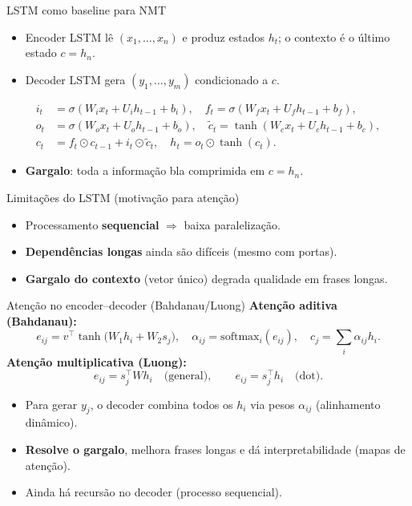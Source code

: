 \documentclass{beamer}
\begin{document}
\begin{frame}{LSTM como baseline para NMT}
	\begin{itemize}
		\item Encoder LSTM lê $(x_1,\dots,x_n)$ e produz estados $h_t$; o contexto é o último estado $c=h_n$.
		\item Decoder LSTM gera $(y_1,\dots,y_m)$ condicionado a $c$.
	\end{itemize}
	\[
		\begin{aligned}
			i_t & = \sigma(W_i x_t + U_i h_{t-1} + b_i),\quad
			f_t = \sigma(W_f x_t + U_f h_{t-1} + b_f),              \\
			o_t & = \sigma(W_o x_t + U_o h_{t-1} + b_o),\quad
			\tilde{c}_t = \tanh(W_c x_t + U_c h_{t-1} + b_c),       \\
			c_t & = f_t \odot c_{t-1} + i_t \odot \tilde{c}_t,\quad
			h_t = o_t \odot \tanh(c_t).
		\end{aligned}
	\]
	\begin{itemize}
		\item \textbf{Gargalo}: toda a informação bla comprimida em $c=h_n$.
	\end{itemize}
\end{frame}

\begin{frame}{Limitações do LSTM (motivação para atenção)}
	\begin{itemize}
		\item Processamento \textbf{sequencial} $\Rightarrow$ baixa paralelização.
		\item \textbf{Dependências longas} ainda são difíceis (mesmo com portas).
		\item \textbf{Gargalo do contexto} (vetor único) degrada qualidade em frases longas.
	\end{itemize}
\end{frame}

\begin{frame}{Atenção no encoder--decoder (Bahdanau/Luong)}
	\textbf{Atenção aditiva (Bahdanau):}
	\[
		e_{ij} = v^\top \tanh\!\big(W_1 h_i + W_2 s_j\big),\quad
		\alpha_{ij} = \mathrm{softmax}_i(e_{ij}),\quad
		c_j = \sum_i \alpha_{ij} h_i .
	\]
	\textbf{Atenção multiplicativa (Luong):}
	\[
		e_{ij} = s_j^\top W h_i \quad \text{(general)}, \qquad
		e_{ij} = s_j^\top h_i \quad \text{(dot)}.
	\]
	\begin{itemize}
		\item Para gerar $y_j$, o decoder combina todos os $h_i$ via pesos $\alpha_{ij}$ (alinhamento dinâmico).
		\item \textbf{Resolve o gargalo}, melhora frases longas e dá interpretabilidade (mapas de atenção).
		\item Ainda há recursão no decoder (processo sequencial).
	\end{itemize}
\end{frame}
\end{document}
